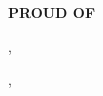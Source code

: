 %
%
%
%
%



\vspace{\spaceBeforeSection}
\textbf{PROUD OF} \hrulefill
\vspace{\spaceAfterSection}


    \href{\achievementAUrl}{\achievementATitleBreak}

    \begin{small}
        \achievementAWho, \ \achievementAWhen
    \end{small}


    \medskip

    \href{\achievementBUrl}{\achievementBTitleBreak}

    \begin{small}
        \achievementBWho, \ \achievementBWhen
    \end{small}

    
